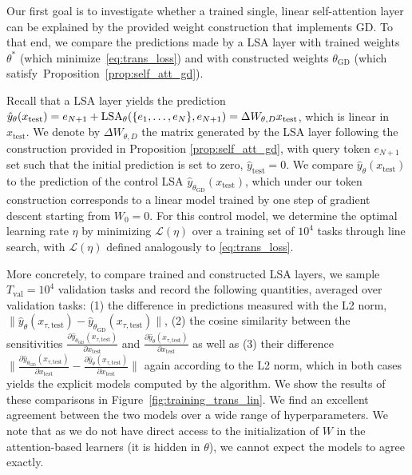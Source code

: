 \documentclass{article}
\theoremstyle{plain}
\theoremstyle{definition}
\theoremstyle{remark}
\begin{document}
Our first goal is to investigate whether a trained single, linear self-attention layer can be explained by the provided weight construction that implements GD. To that end, we compare the predictions made by a LSA layer with trained weights $\theta^*$ (which minimize~\eqref{eq:trans_loss}) and with constructed weights $\theta_\text{GD}$ (which satisfy~Proposition~\ref{prop:self_att_gd}).

Recall that a LSA layer yields the prediction $\hat{y}_{\theta}(x_{\text{test}}) = e_{N+1} + \text{LSA}_{\theta}(\{e_1,\ldots,e_N\},e_{N+1}) = \Delta W_{\theta,D} x_{\text{test}}$, which is linear in $x_{\text{test}}$. We denote by $\Delta W_{\theta,D}$ the matrix generated by the LSA layer following the construction provided in Proposition \ref{prop:self_att_gd}, with query token $e_{N+1}$ set such that the initial prediction is set to zero, $\hat{y}_{\text{test}} = 0$. We compare $\hat{y}_{\theta}(x_{\text{test}})$ to the prediction of the control LSA $\hat{y}_{\theta_\text{GD}}(x_{\text{test}})$, which under our token construction corresponds to a linear model trained by one step of gradient descent starting from $W_0=0$. For this control model, we determine the optimal learning rate $\eta$ by minimizing $\mathcal{L}(\eta)$ over a training set of $10
^4$ tasks through line search, with $\mathcal{L}(\eta)$ defined analogously to \eqref{eq:trans_loss}. 

More concretely, to compare trained and constructed LSA layers, we sample $T_\text{val}=10^4$ validation tasks and record the following quantities, averaged over validation tasks: (1) the difference in predictions measured with the L2 norm, $\|\hat{y}_\theta(x_{\tau,\text{test}}) - \hat{y}_{\theta_\text{GD}}(x_{\tau,\text{test}})\|$, (2) the cosine similarity between the sensitivities $\frac{\partial \hat{y}_{\theta_{\text{GD}}}(x_{\tau,\text{test}}) }{\partial x_{\text{test}}} $ and $ \frac{\partial \hat{y}_{\theta}(x_{\tau,\text{test}})}{\partial x_{\text{test}}}$ as well as (3) their difference $\|\frac{\partial \hat{y}_{\theta_{\text{GD}}}(x_{\tau,\text{test}}) }{\partial x_{\text{test}}} - \frac{\partial \hat{y}_{\theta}(x_{\tau,\text{test}})}{\partial x_{\text{test}}}\|$ again according to the L2 norm, which in both cases yields the explicit models computed by the algorithm. We show the results of these comparisons in Figure~\ref{fig:training_trans_lin}. We find an excellent agreement between the two models over a wide range of hyperparameters. We note that as we do not have direct access to the initialization of $W$ in the attention-based learners (it is hidden in $\theta$), we cannot expect the models to agree exactly.
\end{document}
